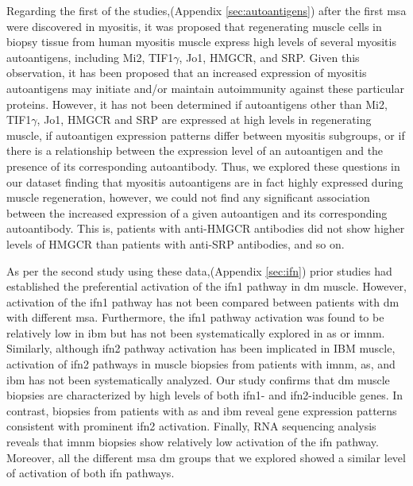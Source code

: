 Regarding the first of the studies,(Appendix \autoref{sec:autoantigens}) after the first \gls{msa} were discovered in myositis, it was proposed that regenerating muscle cells in biopsy tissue from human myositis muscle express high levels of several myositis autoantigens, including Mi2, TIF1$\gamma$, Jo1, HMGCR, and SRP.\cite{Mohassel2015,Mammen2009,CasciolaRosen2005,Allenbach2018} Given this observation, it has been proposed that an increased expression of myositis autoantigens may initiate and/or maintain autoimmunity against these particular proteins. However, it has not been determined if autoantigens other than Mi2, TIF1$\gamma$, Jo1, HMGCR and SRP are expressed at high levels in regenerating muscle, if autoantigen expression patterns differ between myositis subgroups, or if there is a relationship between the expression level of an autoantigen and the presence of its corresponding autoantibody. Thus, we explored these questions in our dataset finding that myositis autoantigens are in fact highly expressed during muscle regeneration, however, we could not find any significant association between the increased expression of a given autoantigen and its corresponding autoantibody. This is, patients with anti-HMGCR antibodies did not show higher levels of HMGCR than patients with anti-SRP antibodies, and so on.

As per the second study using these data,(Appendix \autoref{sec:ifn}) prior studies had established the preferential activation of the \gls{ifn}1 pathway in \gls{dm} muscle.\cite{Greenberg2005} However, activation of the \gls{ifn}1 pathway has not been compared between patients with \gls{dm} with different \gls{msa}. Furthermore, the \gls{ifn}1 pathway activation was found to be relatively low in \gls{ibm} but has not been systematically explored in \gls{as} or \gls{imnm}.\cite{Greenberg2005,Salajegheh2010,Greenberg2002} Similarly, although \gls{ifn}2 pathway activation has been implicated in IBM muscle,\cite{Ivanidze2011,Allenbach2014} activation of \gls{ifn}2 pathways in muscle biopsies from patients with \gls{imnm}, \gls{as}, and \gls{ibm} has not been systematically analyzed. Our study confirms that \gls{dm} muscle biopsies are characterized by high levels of both \gls{ifn}1- and \gls{ifn}2-inducible genes. In contrast, biopsies from patients with \gls{as} and \gls{ibm} reveal gene expression patterns consistent with prominent \gls{ifn}2 activation. Finally, RNA sequencing analysis reveals that \gls{imnm} biopsies show relatively low activation of the \gls{ifn} pathway. Moreover, all the different \gls{msa} \gls{dm} groups that we explored showed a similar level of activation of both \gls{ifn} pathways.

